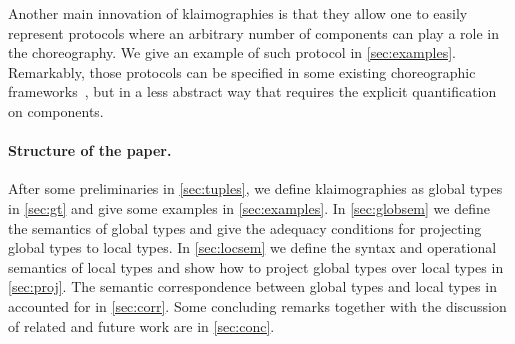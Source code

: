 Another main innovation of klaimographies is that they allow one to easily
represent protocols where an arbitrary number of components can
play a role in the choreography.
%
We give an example of such protocol in \cref{sec:examples}.
%
Remarkably, those protocols can be specified in some existing
choreographic frameworks~\cite{ydbh10,chjny19}, but in a less abstract way
that requires the explicit quantification on components.

\paragraph{Structure of the paper.}
After some preliminaries in \cref{sec:tuples}, we define klaimographies as global types in \cref{sec:gt} and give some examples in \cref{sec:examples}.
In \cref{sec:globsem} we define the semantics of global types and give the adequacy conditions for projecting global types to local types.
In \cref{sec:locsem} we define the syntax and operational semantics of local types and show how to project global types over local types in \cref{sec:proj}.
The semantic correspondence between global types and local types in accounted for in \cref{sec:corr}.
Some concluding remarks together with the discussion of related and future work are in \cref{sec:conc}.


